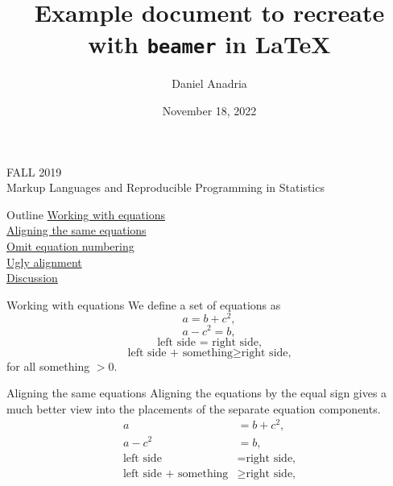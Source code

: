 \documentclass[11pt, aspectratio=169]{beamer}
\title{Example document to recreate with \texttt{beamer} in \LaTeX}
\author{Daniel Anadria}
\date{November 18, 2022}
\begin{document}
	
	\begin{frame}[plain]
		\titlepage
		\vspace{\fill}
		\centering FALL 2019\\Markup Languages and Reproducible Programming in Statistics
	\end{frame}
	
	
	\begin{frame}{Outline}
		\hyperlink{working}{Working with equations} \\
		\hspace{5mm} \hyperlink{aligning}{Aligning the same equations} \\
		\hspace{5mm} \hyperlink{omit}{Omit equation numbering} \\
		\hspace{5mm} \hyperlink{ugly}{Ugly alignment} \\
		\vspace{10mm}
		\hyperlink{discussion}{Discussion}
	\end{frame}
	
	
	\begin{frame}[label=working]{Working with equations}
		We define a set of equations as
		\begin{equation} a = b + c^2, \end{equation}
		\begin{equation} a - c^2 = b, \end{equation}
		\begin{equation} \text{left side = right side,} \end{equation}
		\begin{equation} \text{left side + something} \geq \text{right side,} \end{equation}
		for all something $> 0$.
	\end{frame}
	
	
	\begin{frame}[label=aligning]{Aligning the same equations}
		Aligning the equations by the equal sign gives a much better view into the placements of the separate equation components.
		\begin{align}
			a &= b + c^2, \\
			a - c^2 &= b, \\
			\text{left side} &= \text{right side,} \\
			\text{left side + something} &\geq \text{right side,}
		\end{align}
	\end{frame}
	
\end{document}
